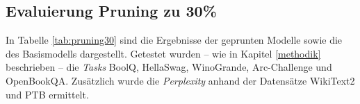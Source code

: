 \newpage

\subsection{Evaluierung Pruning zu 30\%}\label{evaluation-30}

In Tabelle \ref{tab:pruning30} sind die Ergebnisse der geprunten Modelle sowie
die des Basismodells dargestellt. Getestet wurden – wie in Kapitel
\ref{methodik} beschrieben – die \emph{Tasks} BoolQ, HellaSwag, WinoGrande,
Arc-Challenge und OpenBookQA. Zusätzlich wurde die \emph{Perplexity} anhand der
Datensätze WikiText2 und PTB ermittelt.

\vspace{1em}
\begin{table}[h]
	\centering
\end{table}
